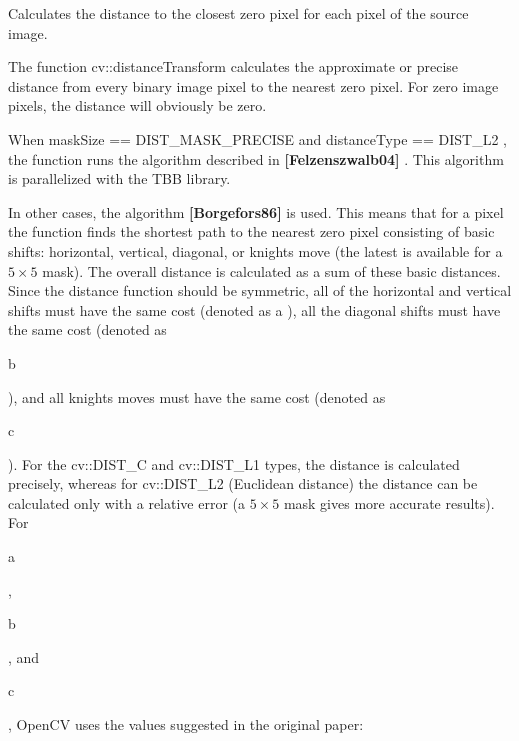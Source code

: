 Calculates the distance to the closest zero pixel for each pixel of the source image. 

The function cv\+::distance\+Transform calculates the approximate or precise distance from every binary image pixel to the nearest zero pixel. For zero image pixels, the distance will obviously be zero. 

When mask\+Size == D\+I\+S\+T\+\_\+\+M\+A\+S\+K\+\_\+\+P\+R\+E\+C\+I\+SE and distance\+Type == D\+I\+S\+T\+\_\+\+L2 , the function runs the algorithm described in {\bfseries [Felzenszwalb04]} . This algorithm is parallelized with the T\+BB library. 

In other cases, the algorithm {\bfseries [Borgefors86]} is used. This means that for a pixel the function finds the shortest path to the nearest zero pixel consisting of basic shifts\+: horizontal, vertical, diagonal, or knight\textquotesingle{}s move (the latest is available for a $5\times 5$ mask). The overall distance is calculated as a sum of these basic distances. Since the distance function should be symmetric, all of the horizontal and vertical shifts must have the same cost (denoted as a ), all the diagonal shifts must have the same cost (denoted as
\begin{DoxyCode}
b 
\end{DoxyCode}
 ), and all knight\textquotesingle{}s moves must have the same cost (denoted as
\begin{DoxyCode}
c 
\end{DoxyCode}
 ). For the cv\+::\+D\+I\+S\+T\+\_\+C and cv\+::\+D\+I\+S\+T\+\_\+\+L1 types, the distance is calculated precisely, whereas for cv\+::\+D\+I\+S\+T\+\_\+\+L2 (Euclidean distance) the distance can be calculated only with a relative error (a $5\times 5$ mask gives more accurate results). For
\begin{DoxyCode}
a 
\end{DoxyCode}
 ,
\begin{DoxyCode}
b 
\end{DoxyCode}
 , and
\begin{DoxyCode}
c 
\end{DoxyCode}
 , Open\+CV uses the values suggested in the original paper\+:

